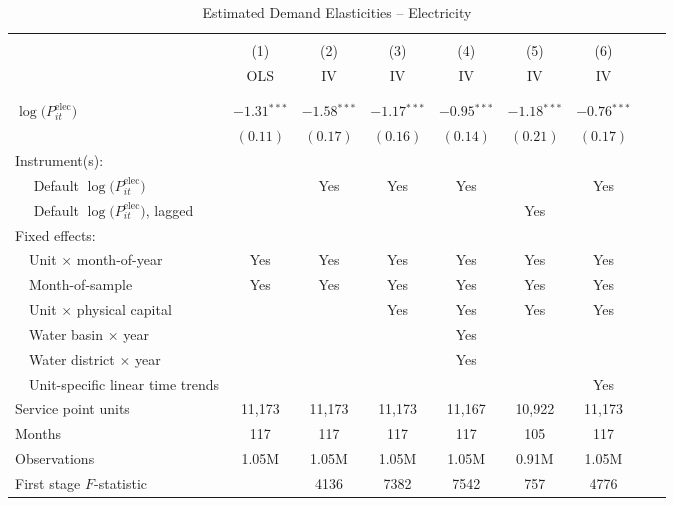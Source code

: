 \begin{table}[t!]\centering
\small
\caption{Estimated Demand Elasticities -- Electricity  \label{tab:elec_regs_main}}
\vspace{-0.1cm}
\small
\begin{adjustbox}{center} 
\begin{tabular}{lcccccccc} 
\hline \hline
\vspace{-0.37cm}
\\
 & (1)  & (2)  & (3)  & (4)  & (5)  & (6) \\ 
[0.1em]
 & OLS & IV & IV & IV & IV & IV \\
\vspace{-0.37cm}
\\
\cline{2-7}
\vspace{-0.27cm}
\\
 $\log\big(P^{\text{elec}}_{it}\big)$ ~ & $-1.31$$^{***}$  & $-1.58$$^{***}$ & $-1.17$$^{***}$ & $-0.95$$^{***}$ & $-1.18$$^{***}$  & $-0.76$$^{***}$ \\ 
& $(0.11)$ & $(0.17)$ & $(0.16)$ & $(0.14)$ & $(0.21)$ & $(0.17)$ \\
[1.5em] 
Instrument(s): \\
[0.1em] 
~~ Default $\log\big(P^{\text{elec}}_{it}\big)$  & & Yes & Yes  & Yes  & & Yes \\
[0.1em] 
~~ Default $\log\big(P^{\text{elec}}_{it}\big)$, lagged  & & & & & Yes & \\
[1.5em] 
Fixed effects: \\
[0.1em] 
~~Unit $\times$ month-of-year  & Yes  & Yes  & Yes  & Yes  & Yes  & Yes   \\ 
[0.1em] 
~~Month-of-sample  & Yes  & Yes  & Yes  & Yes  & Yes  & Yes   \\ 
[0.1em] 
~~Unit $\times$ physical capital & & & Yes & Yes & Yes & Yes  \\
[0.1em] 
~~Water basin $\times$ year & & &  & Yes & &  \\
[0.1em] 
~~Water district $\times$ year & & &  & Yes & & \\
[0.1em] 
~~Unit-specific linear time trends & & & & & &  Yes \\
[1.5em] 
Service point units & 11,173 & 11,173 & 11,173 & 11,167 & 10,922 & 11,173  \\ 
[0.1em] 
Months  & 117 & 117 & 117 & 117 & 105 & 117 \\ 
[0.1em] 
Observations & 1.05M & 1.05M & 1.05M & 1.05M & 0.91M & 1.05M \\ 
[0.1em] 
First stage $F$-statistic &  & 4136 & 7382 & 7542 & 757 & 4776 \\ 

\end{tabular}
\end{adjustbox}
\end{table}
